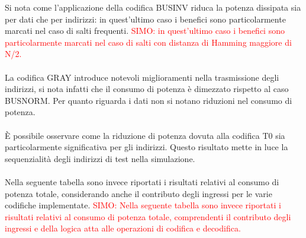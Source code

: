 \documentclass[11pt,  english, makeidx, a4paper, titlepage, oneside]{book}
\begin{document}
Si nota come l'applicazione della codifica BUSINV riduca la potenza dissipata sia per dati che per indirizzi: in quest'ultimo caso i benefici sono particolarmente marcati nel caso di salti frequenti.
\textcolor{red}{SIMO: in quest'ultimo caso i benefici sono particolarmente marcati nel caso di salti con distanza di Hamming maggiore di N/2.}
\\\\
La codifica GRAY introduce notevoli miglioramenti nella trasmissione degli indirizzi, si nota infatti che il consumo di potenza è dimezzato rispetto al caso BUSNORM. Per quanto riguarda i dati non si notano riduzioni nel consumo di potenza.
\\\\
È possibile osservare come la riduzione di potenza dovuta alla codifica T0 sia particolarmente significativa per gli indirizzi. Questo risultato mette in luce la sequenzialità degli indirizzi di test nella simulazione.
\\\\
Nella seguente tabella sono invece riportati i risultati relativi al consumo di potenza totale, considerando anche il contributo degli ingressi per le varie codifiche implementate.
\textcolor{red}{SIMO: Nella seguente tabella sono invece riportati i risultati relativi al consumo di potenza totale, comprendenti il contributo degli ingressi e della logica atta alle operazioni di codifica e decodifica.}
\end{document}
